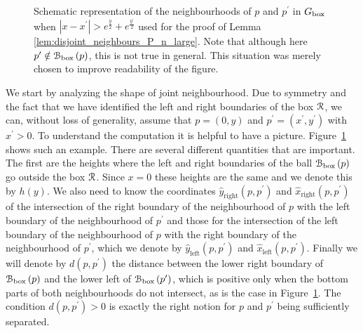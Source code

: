 \begin{figure}[!ht]
\caption{Schematic representation of the neighbourhoods of $p$ and $p^\prime$ in $G_{\text{box}}$ when $|x - x^\prime| > e^{\frac{y}{2}} + e^{\frac{y^\prime}{2}}$ used for the proof of Lemma \ref{lem:disjoint_neighbours_P_n_large}. Note that although here $p^\prime \notin {\mathcal B}_{\text{box}}\left(p\right)$, this is not true in general. This situation was merely chosen to improve readability of the figure.}
\label{fig:representation_disjoint_neighbourhoods_P_n_3}
\end{figure}


We start by analyzing the shape of joint neighbourhood. Due to symmetry and the fact that we have identified the left and right boundaries of the box ${\mathcal R}$, we can, without loss of generality, assume that $p = (0,y)$ and $p^\prime = (x^\prime,y^\prime)$ with $x^\prime > 0$. To understand the computation it is helpful to have a picture. Figure~\ref{fig:representation_disjoint_neighbourhoods_P_n_3} shows such an example. There are several different quantities that are important. The first are the heights where the left and right boundaries of the ball ${\mathcal B}_{\text{box}}\left(p\right)$ go outside the box ${\mathcal R}$. Since $x = 0$ these heights are the same and we denote this by $h(y)$. We also need to know the coordinates $\hat{y}_{\text{right}}(p,p^\prime)$ and $\hat{x}_{\text{right}}(p,p^\prime)$ of the intersection of the right boundary of the neighbourhood of $p$ with the left boundary of the neighbourhood of $p^\prime$ and those for the intersection of the left boundary of the neighbourhood of $p$ with the right boundary of the neighbourhood of $p^\prime$, which we denote by $\hat{y}_{\text{left}}(p,p^\prime)$ and $\hat{x}_{\text{left}}(p,p^\prime)$. Finally we will denote by $d(p,p^\prime)$ the distance between the lower right boundary of ${\mathcal B}_{\text{box}}\left(p\right)$ and the lower left of ${\mathcal B}_{\text{box}}\left(p^\prime\right)$, which is positive only when the bottom parts of both neighbourhoods do not intersect, as is the case in Figure~\ref{fig:representation_disjoint_neighbourhoods_P_n_3}. The condition $d(p,p^\prime) > 0$ is exactly the right notion for $p$ and $p^\prime$ being sufficiently separated.

